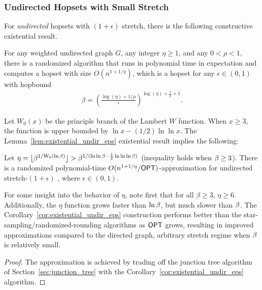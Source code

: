 \subsubsection{Undirected Hopsets with Small Stretch}
For \textit{undirected} hopsets with $(1+\epsilon)$ stretch, there is the following constructive existential result.

\begin{lemma} \label{lem:existential_undir_eps}
    For any weighted undirected graph $G$, any integer $\eta \geq 1$, and any $0 < \rho < 1$, there is a randomized algorithm that runs in polynomial time in expectation and computes a hopset with size $O(n^{1 + 1/\eta})$, which is a hopset for any $\epsilon \in (0,1)$ with hopbound
    \begin{align*}
        \beta = \left( \frac{\log(\eta) + 1/\rho }{\epsilon}   \right)^{\log(\eta) + \frac{1}{\rho}+1} .
    \end{align*}
\end{lemma}

Let $W_0(x)$ be the principle branch of the Lambert $W$ function. When $x \geq 3$, the function is upper bounded by $\ln{x} - (1/2) \ln{\ln{x}}$. The Lemma~\ref{lem:existential_undir_eps} existential result implies the following:

\begin{corollary} \label{cor:existential_undir_eps}
    Let $\eta = \lfloor \beta^{1/W_0(\ln{\beta})} \rfloor > \beta^{1/(\ln{\ln{\beta}}-\frac{1}{2}\ln{\ln{\ln{\beta}}})}$ (inequality holds when $\beta \geq 3$). There is a randomized polynomial-time $O(n^{1 + 1/\eta} / {{\sf OPT}})$-approximation for undirected stretch-$(1+\epsilon)$ {\hopset}, where $\epsilon \in (0,1)$.
\end{corollary}

For some insight into the behavior of $\eta$, note first that for all $\beta \geq 3$, $\eta \geq 6$. Additionally, the $\eta$ function grows faster than $\ln{\beta}$, but much slower than $\beta$. The Corollary~\ref{cor:existential_undir_eps} construction performs better than the star-sampling/randomized-rounding algorithms as ${\sf OPT}$ grows, resulting in improved approximations compared to the directed graph, arbitrary stretch regime when $\beta$ is relatively small. 

\undirEps*
\begin{proof}
    The approximation is achieved by trading off the junction tree algorithm of Section~\ref{sec:junction_tree} with the Corollary~\ref{cor:existential_undir_eps} algorithm.
\end{proof}



